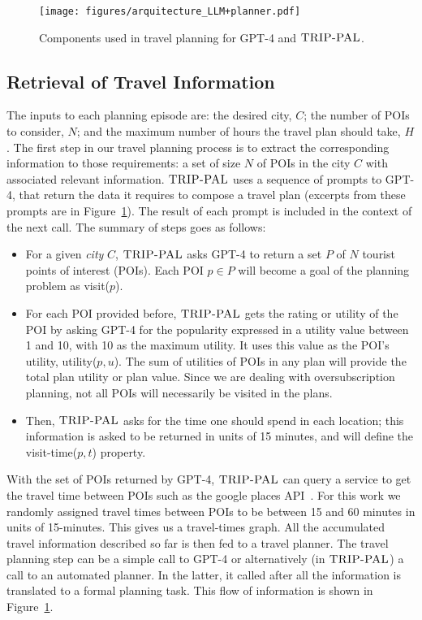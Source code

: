 \documentclass[letterpaper]{article}
\newcommand{\gpt}{{\sc GPT-4}\xspace}
\newcommand{\approach}{\ensuremath{\textsc{TRIP-PAL}}\xspace}
\begin{document}
\begin{figure*}
\centering
\texttt{[image: figures/arquitecture\_LLM+planner.pdf]}
    \caption{Components used in travel planning for \gpt and \approach.}
    \label{fig:architecture}
\end{figure*}

\subsection{Retrieval of Travel Information}

The inputs to each planning episode are: the desired city, $C$; the number of POIs to consider, $N$; and the maximum number of hours the travel plan should take, $H$. The first step in our travel planning process is to extract the corresponding information to those requirements: a set of size $N$ of POIs in the city $C$ with associated relevant information. \approach uses a sequence of prompts to \gpt, that return the data it requires to compose a travel plan (excerpts from these prompts are in Figure~\ref{fig:architecture}). The result of each prompt is included in the context of the next call. The summary of steps goes as follows:
\begin{itemize}
    \item For a given \textit{city} $C$, \approach asks \gpt to return a set $P$ of $N$ tourist points of interest (POIs). Each POI $p\in P$ will become a goal of the planning problem as visit($p$).
    \item For each POI provided before, \approach gets the rating or utility of the POI by asking \gpt for the popularity expressed in a utility value between 1 and 10, with 10 as the maximum utility. It uses this value as the POI's utility, utility($p, u$). The sum of utilities of POIs in any plan will provide the total plan utility or plan value. Since we are dealing with oversubscription planning, not all POIs will necessarily be visited in the plans. 
    \item Then, \approach asks for the time one should spend in each location; this information is asked to be returned in units of 15 minutes, and will define the visit-time($p, t$) property.  
\end{itemize}

With the set of POIs returned by \gpt, \approach can query a service to get the travel time between POIs such as the google places API~\cite{google_places_api}. For this work we randomly assigned travel times between POIs to be between 15 and 60 minutes in units of 15-minutes. This gives us a travel-times graph. 
All the accumulated travel information described so far is then fed to a travel planner. The travel planning step can be a simple call to \gpt or alternatively (in \approach) a call to an automated planner. In the latter, it called after all the information is translated to a formal planning task. This flow of information is shown in Figure~\ref{fig:architecture}.
\end{document}
